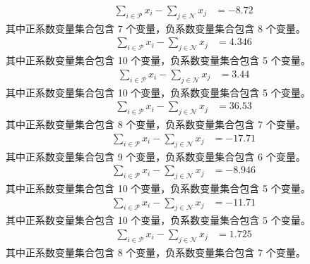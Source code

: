 \documentclass[a4paper,11pt]{article}
\begin{document}
\begin{align}
\sum_{i \in \mathcal{P}} x_i - \sum_{j \in \mathcal{N}} x_j &= -8.72 \nonumber
\end{align}
其中正系数变量集合包含 7 个变量，负系数变量集合包含 8 个变量。\\[0.3em]

\begin{align}
\sum_{i \in \mathcal{P}} x_i - \sum_{j \in \mathcal{N}} x_j &= 4.346 \nonumber
\end{align}
其中正系数变量集合包含 10 个变量，负系数变量集合包含 5 个变量。\\[0.3em]

\begin{align}
\sum_{i \in \mathcal{P}} x_i - \sum_{j \in \mathcal{N}} x_j &= 3.44 \nonumber
\end{align}
其中正系数变量集合包含 10 个变量，负系数变量集合包含 5 个变量。\\[0.3em]

\begin{align}
\sum_{i \in \mathcal{P}} x_i - \sum_{j \in \mathcal{N}} x_j &= 36.53 \nonumber
\end{align}
其中正系数变量集合包含 8 个变量，负系数变量集合包含 7 个变量。\\[0.3em]

\begin{align}
\sum_{i \in \mathcal{P}} x_i - \sum_{j \in \mathcal{N}} x_j &= -17.71 \nonumber
\end{align}
其中正系数变量集合包含 9 个变量，负系数变量集合包含 6 个变量。\\[0.3em]

\begin{align}
\sum_{i \in \mathcal{P}} x_i - \sum_{j \in \mathcal{N}} x_j &= -8.946 \nonumber
\end{align}
其中正系数变量集合包含 10 个变量，负系数变量集合包含 5 个变量。\\[0.3em]

\begin{align}
\sum_{i \in \mathcal{P}} x_i - \sum_{j \in \mathcal{N}} x_j &= -11.71 \nonumber
\end{align}
其中正系数变量集合包含 10 个变量，负系数变量集合包含 5 个变量。\\[0.3em]

\begin{align}
\sum_{i \in \mathcal{P}} x_i - \sum_{j \in \mathcal{N}} x_j &= 1.725 \nonumber
\end{align}
其中正系数变量集合包含 8 个变量，负系数变量集合包含 7 个变量。\\[0.3em]
\end{document}
